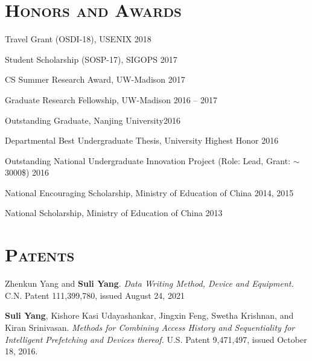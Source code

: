 \documentclass[10pt, letterpaper]{article}
\renewenvironment{itemize}{
  \begin{list}{}{
    \setlength{\leftmargin}{1.2em}
    \setlength{\itemsep}{0.12em}
    \setlength{\parskip}{0pt}
    \setlength{\parsep}{0.12em}
  }
}{
  \end{list}
}
\begin{document}
\section*{\textsc{Honors and Awards}}
\begin{itemize}
  \item Travel Grant (OSDI-18), USENIX \hfill 2018
  \item Student Scholarship (SOSP-17), SIGOPS \hfill 2017
  \item CS Summer Research Award, UW-Madison \hfill 2017
  \item Graduate Research Fellowship, UW-Madison \hfill 2016 -- 2017
  \item Outstanding Graduate, Nanjing University\hfill 2016
  \item Departmental Best Undergraduate Thesis, University Highest Honor \hfill 2016
  \item Outstanding National Undergraduate Innovation Project (Role: Lead, Grant: $\sim$3000\$)  \hfill 2016
  \item National Encouraging Scholarship, Ministry of Education of China \hfill 2014, 2015
  \item National Scholarship, Ministry of Education of China \hfill 2013
\end{itemize}
\fi

\section*{\textsc{Patents}}
\begin{enumerate}[fullwidth,itemindent=1.1em,label={[\arabic*]}]
    \item Zhenkun Yang and {\bf Suli Yang}. \textit{Data Writing Method, Device and Equipment.} C.N. Patent 111,399,780, issued August 24, 2021

     \item {\bf Suli Yang}, Kishore Kasi Udayashankar, Jingxin Feng, Swetha Krishnan, and Kiran Srinivasan. \textit{Methods for Combining Access History and Sequentiality for Intelligent Prefetching and Devices thereof.} U.S. Patent 9,471,497, issued October 18, 2016.

\end{enumerate}

\end{document}
